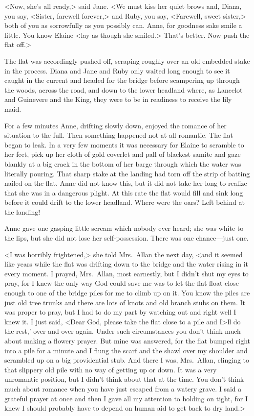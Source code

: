 <Now, she's all ready,> said Jane. <We must kiss her quiet brows and, Diana, you say, <Sister, farewell forever,> and Ruby, you say, <Farewell, sweet sister,> both of you as sorrowfully as you possibly can. Anne, for goodness sake smile a little. You know Elaine <lay as though she smiled.> That's better. Now push the flat off.>

The flat was accordingly pushed off, scraping roughly over an old embedded stake in the process. Diana and Jane and Ruby only waited long enough to see it caught in the current and headed for the bridge before scampering up through the woods, across the road, and down to the lower headland where, as Lancelot and Guinevere and the King, they were to be in readiness to receive the lily maid.

For a few minutes Anne, drifting slowly down, enjoyed the romance of her situation to the full. Then something happened not at all romantic. The flat began to leak. In a very few moments it was necessary for Elaine to scramble to her feet, pick up her cloth of gold coverlet and pall of blackest samite and gaze blankly at a big crack in the bottom of her barge through which the water was literally pouring. That sharp stake at the landing had torn off the strip of batting nailed on the flat. Anne did not know this, but it did not take her long to realize that she was in a dangerous plight. At this rate the flat would fill and sink long before it could drift to the lower headland. Where were the oars? Left behind at the landing!

Anne gave one gasping little scream which nobody ever heard; she was white to the lips, but she did not lose her self-possession. There was one chance—just one.

<I was horribly frightened,> she told Mrs.~Allan the next day, <and it seemed like years while the flat was drifting down to the bridge and the water rising in it every moment. I prayed, Mrs.~Allan, most earnestly, but I didn't shut my eyes to pray, for I knew the only way God could save me was to let the flat float close enough to one of the bridge piles for me to climb up on it. You know the piles are just old tree trunks and there are lots of knots and old branch stubs on them. It was proper to pray, but I had to do my part by watching out and right well I knew it. I just said, <Dear God, please take the flat close to a pile and I>ll do the rest,' over and over again. Under such circumstances you don't think much about making a flowery prayer. But mine was answered, for the flat bumped right into a pile for a minute and I flung the scarf and the shawl over my shoulder and scrambled up on a big providential stub. And there I was, Mrs.~Allan, clinging to that slippery old pile with no way of getting up or down. It was a very unromantic position, but I didn't think about that at the time. You don't think much about romance when you have just escaped from a watery grave. I said a grateful prayer at once and then I gave all my attention to holding on tight, for I knew I should probably have to depend on human aid to get back to dry land.>

